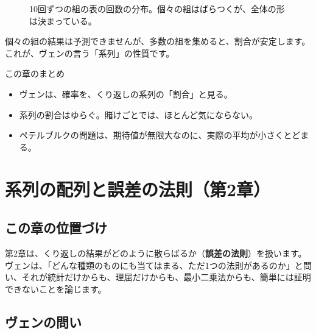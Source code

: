 \documentclass[a4paper,11pt,openany]{ltjsbook}
\begin{document}
\begin{figure}[htbp]
\centering
{}
\caption{10回ずつの組の表の回数の分布。個々の組はばらつくが、全体の形は決まっている。}
\end{figure}

個々の組の結果は予測できませんが、多数の組を集めると、割合が安定します。これが、ヴェンの言う「系列」の性質です。

\begin{pointbox}{この章のまとめ}
\begin{itemize}[leftmargin=*]
\item ヴェンは、確率を、くり返しの系列の「割合」と見る。
\item 系列の割合はゆらぐ。賭けごとでは、ほとんど気にならない。
\item ペテルブルクの問題は、期待値が無限大なのに、実際の平均が小さくとどまる。
\end{itemize}
\end{pointbox}

\chapter{系列の配列と誤差の法則（第2章）}

\section{この章の位置づけ}

第2章は、くり返しの結果がどのように散らばるか（\textbf{誤差の法則}）を扱います。ヴェンは、「どんな種類のものにも当てはまる、ただ1つの法則があるのか」と問い、それが統計だけからも、理屈だけからも、最小二乗法からも、簡単には証明できないことを論じます。

\section{ヴェンの問い}
\end{document}
